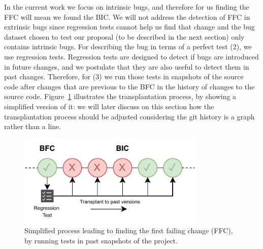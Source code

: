 In the current work we focus on intrinsic bugs, and therefore for us finding the FFC will mean we found the BIC.
We will not address the detection of FFC in extrinsic bugs since regression tests cannot help us find that change and the bug dataset chosen to test our proposal (to be described in the next section) only contains intrinsic bugs.
For describing the bug in terms of a perfect test (2), we use regression tests. Regression tests are designed to detect if bugs are introduced in future changes, and we postulate that they are also useful to detect them in past changes.
Therefore, for (3) we run those tests in snapshots of the source code after changes that are previous to the BFC  in the history of changes to the source code. 
Figure~\ref{fig:process} illustrates the transplantation process, by showing a simplified version of it: we will later discuss on this section how the transplantation process should be adjusted considering the git history is a graph rather than a line.

\begin{figure}[h!]
  \centering    
  \includegraphics[width=0.8\textwidth]{pages/03-BugHunter/images/Model.pdf}
  \vspace{-0.5cm}
  \caption{Simplified process leading to finding the first failing change (FFC), by running tests in past snapshots of the project.}
  \label{fig:process}
  \vspace{-0.5cm}
\end{figure}

